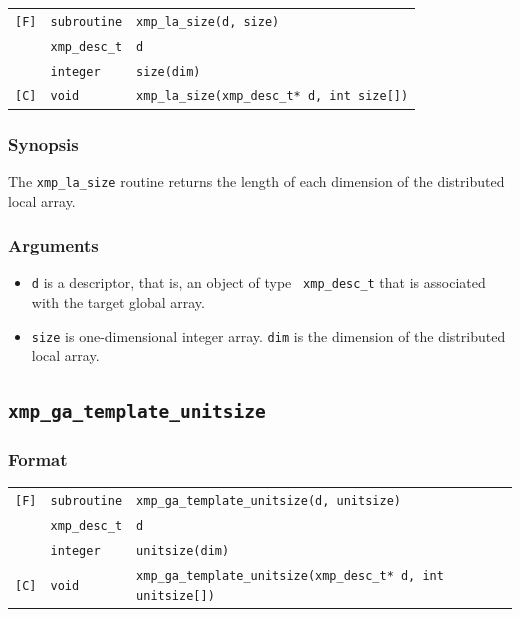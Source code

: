 \begin{tabular}{lll}

\verb![F]!& {\tt subroutine}& {\tt xmp\_la\_size(d, size)}\\
          & {\tt xmp\_desc\_t} & {\tt d}\\
          & {\tt integer} & {\tt size(dim)}\\

\verb![C]!&  {\tt void}& {\tt xmp\_la\_size(xmp\_desc\_t* d, int size[])}\\

\end{tabular}

\subsubsection*{Synopsis}

The {\tt xmp\_la\_size} routine returns the length of each dimension of
 the distributed local array.

\subsubsection*{Arguments}

\begin{itemize}
 \item {\tt d} is a descriptor, that is, an object of type {\tt
       xmp\_desc\_t} that is associated with the target global array.
 \item {\tt size} is one-dimensional integer array. {\tt dim} is the dimension 
       of the distributed local array.
\end{itemize}

\subsection{\tt xmp\_ga\_template\_unitsize}

\subsubsection*{Format}

\begin{tabular}{lll}

\verb![F]!&  {\tt subroutine}& {\tt xmp\_ga\_template\_unitsize(d, unitsize)}\\
          & {\tt xmp\_desc\_t} & {\tt d}\\
          & {\tt integer} & {\tt unitsize(dim)}\\

\verb![C]!&  {\tt void}& {\tt xmp\_ga\_template\_unitsize(xmp\_desc\_t* d, int unitsize[])}\\

\end{tabular}

